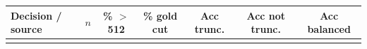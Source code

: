 \begin{tabular}{lcccccc}
\toprule
\textbf{Decision / source} & $n$ & \textbf{\% $>$512} & \textbf{\% gold cut} & \textbf{Acc trunc.} & \textbf{Acc not trunc.} & \textbf{Acc balanced} \\
\midrule
\ph{--} & & & & & & \\
\bottomrule
\end{tabular}
